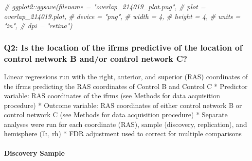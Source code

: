 \documentclass[
]{article}
\newenvironment{Shaded}{\begin{snugshade}}{\end{snugshade}}
\newcommand{\CommentTok}[1]{\textcolor[rgb]{0.56,0.35,0.01}{\textit{#1}}}
\begin{document}
\begin{Shaded}
\begin{Highlighting}[]
\CommentTok{# ggplot2::ggsave(filename = "overlap_214019_plot.png",}
\CommentTok{#                 plot = overlap_214019.plot,}
\CommentTok{#                 device = "png",}
\CommentTok{#                 width = 4,}
\CommentTok{#                 height = 4, }
\CommentTok{#                 units = "in",}
\CommentTok{#                 dpi = "retina")}
\end{Highlighting}
\end{Shaded}

\hypertarget{q2-is-the-location-of-the-ifrms-predictive-of-the-location-of-control-network-b-andor-control-network-c}{%
\subsubsection{Q2: Is the location of the ifrms predictive of the
location of control network B and/or control network
C?}\label{q2-is-the-location-of-the-ifrms-predictive-of-the-location-of-control-network-b-andor-control-network-c}}

Linear regressions run with the right, anterior, and superior (RAS)
coordinates of the ifrms predicting the RAS coordinates of Control B and
Control C * Predictor variable: RAS coordinates of the ifrms (see
Methods for data acquisition procedure) * Outcome variable: RAS
coordinates of either control network B or control network C (see
Methods for data acquisition procedure) * Separate analyses were run for
each coordinate (RAS), sample (discovery, replication), and hemisphere
(lh, rh) * FDR adjustment used to correct for multiple comparisons

\hypertarget{discovery-sample-4}{%
\paragraph{Discovery Sample}\label{discovery-sample-4}}
\end{document}
